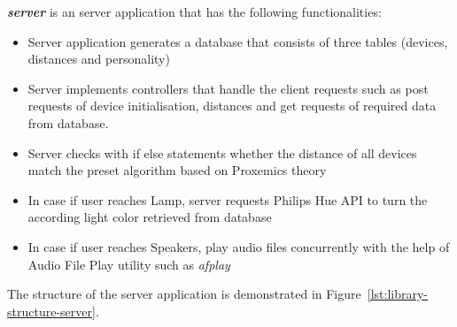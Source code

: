 \textbf{\emph{server}} is an server application that has the following functionalities:
\begin{itemize}
    \item Server application generates a database that consists of three tables (devices, distances and personality)
    \item Server implements controllers that handle the client requests such as post requests of device initialisation,
        distances and get requests of required data from database.
    \item Server checks with if else statements whether the distance of all devices match the preset
        algorithm based on Proxemics theory
    \item In case if user reaches Lamp, server requests Philips Hue API to turn the according light color retrieved from database
    \item In case if user reaches Speakers, play audio files concurrently with the help of Audio File Play
        utility such as \emph{afplay}
\end{itemize}

The structure of the server application is demonstrated in Figure~\ref{lst:library-structure-server}.


